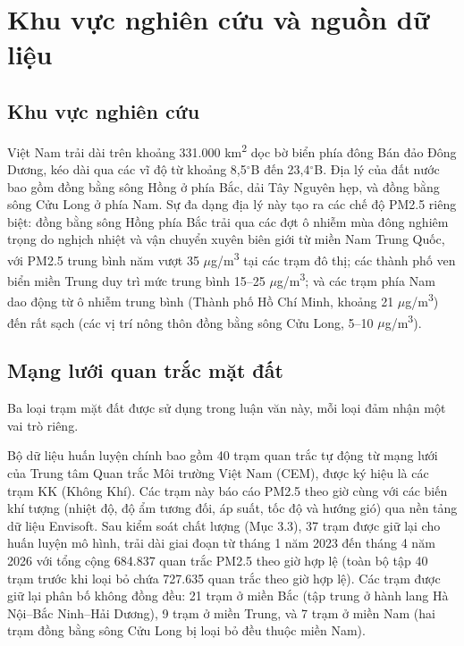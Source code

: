 \section{Khu vực nghiên cứu và nguồn dữ liệu}

\subsection{Khu vực nghiên cứu}

Việt Nam trải dài trên khoảng 331.000 km\textsuperscript{2} dọc bờ biển phía đông Bán đảo Đông Dương, kéo dài qua các vĩ độ từ khoảng 8,5$^\circ$B đến 23,4$^\circ$B. Địa lý của đất nước bao gồm đồng bằng sông Hồng ở phía Bắc, dải Tây Nguyên hẹp, và đồng bằng sông Cửu Long ở phía Nam. Sự đa dạng địa lý này tạo ra các chế độ PM2.5 riêng biệt: đồng bằng sông Hồng phía Bắc trải qua các đợt ô nhiễm mùa đông nghiêm trọng do nghịch nhiệt và vận chuyển xuyên biên giới từ miền Nam Trung Quốc, với PM2.5 trung bình năm vượt 35 $\mu$g/m\textsuperscript{3} tại các trạm đô thị; các thành phố ven biển miền Trung duy trì mức trung bình 15--25 $\mu$g/m\textsuperscript{3}; và các trạm phía Nam dao động từ ô nhiễm trung bình (Thành phố Hồ Chí Minh, khoảng 21 $\mu$g/m\textsuperscript{3}) đến rất sạch (các vị trí nông thôn đồng bằng sông Cửu Long, 5--10 $\mu$g/m\textsuperscript{3}).

\subsection{Mạng lưới quan trắc mặt đất}

Ba loại trạm mặt đất được sử dụng trong luận văn này, mỗi loại đảm nhận một vai trò riêng.

Bộ dữ liệu huấn luyện chính bao gồm 40 trạm quan trắc tự động từ mạng lưới của Trung tâm Quan trắc Môi trường Việt Nam (CEM), được ký hiệu là các trạm KK (Không Khí). Các trạm này báo cáo PM2.5 theo giờ cùng với các biến khí tượng (nhiệt độ, độ ẩm tương đối, áp suất, tốc độ và hướng gió) qua nền tảng dữ liệu Envisoft. Sau kiểm soát chất lượng (Mục 3.3), 37 trạm được giữ lại cho huấn luyện mô hình, trải dài giai đoạn từ tháng 1 năm 2023 đến tháng 4 năm 2026 với tổng cộng 684.837 quan trắc PM2.5 theo giờ hợp lệ (toàn bộ tập 40 trạm trước khi loại bỏ chứa 727.635 quan trắc theo giờ hợp lệ). Các trạm được giữ lại phân bố không đồng đều: 21 trạm ở miền Bắc (tập trung ở hành lang Hà Nội--Bắc Ninh--Hải Dương), 9 trạm ở miền Trung, và 7 trạm ở miền Nam (hai trạm đồng bằng sông Cửu Long bị loại bỏ đều thuộc miền Nam).

